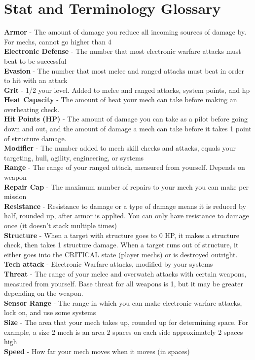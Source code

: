 \section{Stat and Terminology Glossary}

\textbf{Armor} - The amount of damage you reduce all incoming sources of damage by. For mechs, cannot go higher than 4\\
\textbf{Electronic Defense} - The number that most electronic warfare attacks must beat to be successful\\
\textbf{Evasion} - The number that most melee and ranged attacks must beat in order to hit with an attack\\
\textbf{Grit} - 1/2 your level. Added to melee and ranged attacks, system points, and hp\\
\textbf{Heat Capacity} - The amount of heat your mech can take before making an overheating check.\\
\textbf{Hit Points (HP)} - The amount of damage you can take as a pilot before going down and out, and the amount of damage a mech can take before it takes 1 point of structure damage.\\
\textbf{Modifier} - The number added to mech skill checks and attacks, equals your targeting, hull, agility, engineering, or systems\\
\textbf{Range} - The range of your ranged attack, measured from yourself. Depends on weapon\\
\textbf{Repair Cap} - The maximum number of repairs to your mech you can make per mission\\
\textbf{Resistance} - Resistance to damage or a type of damage means it is reduced by half, rounded up, after armor is applied. You can only have resistance to damage once (it doesn’t stack multiple times)\\
\textbf{Structure} - When a target with structure goes to 0 HP, it makes a structure check, then takes 1 structure damage. When a target runs out of structure, it either goes into the CRITICAL state (player mechs) or is destroyed outright.\\
\textbf{Tech attack} - Electronic Warfare attacks, modified by your systems\\
\textbf{Threat} - The range of your melee and overwatch attacks with certain weapons, measured from yourself. Base threat for all weapons is 1, but it may be greater depending on the weapon.\\
\textbf{Sensor Range} - The range in which you can make electronic warfare attacks, lock on, and use some systems\\
\textbf{Size} - The area that your mech takes up, rounded up for determining space. For example, a size 2 mech is an area 2 spaces on each side approximately 2 spaces high\\
\textbf{Speed} - How far your mech moves when it moves (in spaces)
